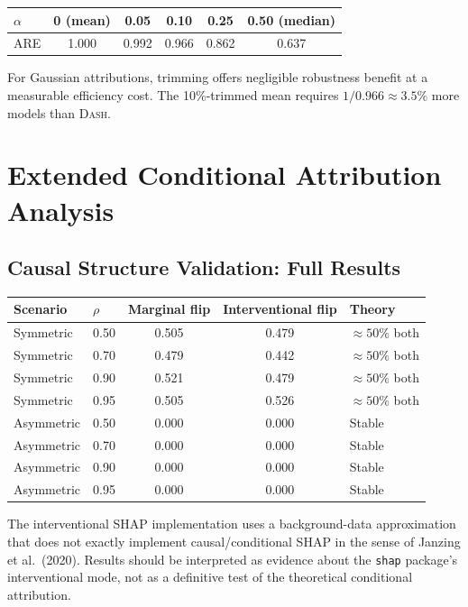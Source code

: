 \documentclass{article}
\newcommand{\DASH}{\textsc{Dash}}
\begin{document}
\begin{center}
\small
\begin{tabular}{@{}lccccc@{}}
\toprule
$\alpha$ & 0 (mean) & 0.05 & 0.10 & 0.25 & 0.50 (median) \\
\midrule
ARE & 1.000 & 0.992 & 0.966 & 0.862 & 0.637 \\
\bottomrule
\end{tabular}
\end{center}

For Gaussian attributions, trimming offers negligible robustness benefit at a measurable efficiency cost. The 10\%-trimmed mean requires $1/0.966 \approx 3.5\%$ more models than \DASH{}.

\section{Extended Conditional Attribution Analysis}

\subsection{Causal Structure Validation: Full Results}

\begin{center}
\small
\begin{tabular}{@{}llccl@{}}
\toprule
Scenario & $\rho$ & Marginal flip & Interventional flip & Theory \\
\midrule
Symmetric & 0.50 & 0.505 & 0.479 & ${\approx}50\%$ both \\
Symmetric & 0.70 & 0.479 & 0.442 & ${\approx}50\%$ both \\
Symmetric & 0.90 & 0.521 & 0.479 & ${\approx}50\%$ both \\
Symmetric & 0.95 & 0.505 & 0.526 & ${\approx}50\%$ both \\
\midrule
Asymmetric & 0.50 & 0.000 & 0.000 & Stable \\
Asymmetric & 0.70 & 0.000 & 0.000 & Stable \\
Asymmetric & 0.90 & 0.000 & 0.000 & Stable \\
Asymmetric & 0.95 & 0.000 & 0.000 & Stable \\
\bottomrule
\end{tabular}
\end{center}

The interventional SHAP implementation uses a background-data approximation that does not exactly implement causal/conditional SHAP in the sense of Janzing et al.\ (2020). Results should be interpreted as evidence about the \texttt{shap} package's interventional mode, not as a definitive test of the theoretical conditional attribution.
\end{document}
